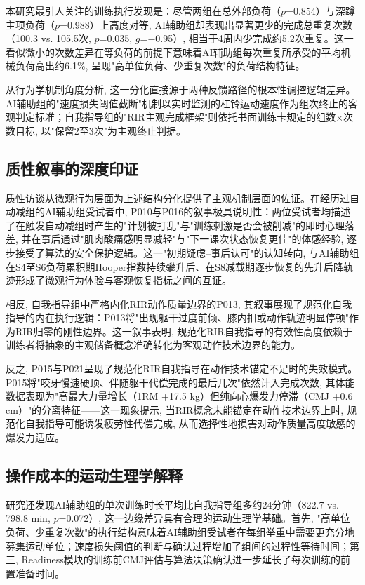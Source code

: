本研究最引人关注的训练执行发现是：尽管两组在总外部负荷（$p$=0.854）与深蹲主项负荷（$p$=0.988）上高度对等, AI辅助组却表现出显著更少的完成总重复次数（100.3 vs. 105.5次, $p$=0.035, $g$=$-$0.95）, 相当于4周内少完成约5.2次重复。这一看似微小的次数差异在等负荷的前提下意味着AI辅助组每次重复所承受的平均机械负荷高出约6.1\%, 呈现"高单位负荷、少重复次数"的负荷结构特征。

从行为学机制角度分析, 这一分化直接源于两种反馈路径的根本性调控逻辑差异。AI辅助组的"速度损失阈值截断"机制以实时监测的杠铃运动速度作为组次终止的客观判定标准；自我指导组的"RIR主观完成框架"则依托书面训练卡规定的组数$\times$次数目标, 以"保留2至3次"为主观终止判据。

\subsection{质性叙事的深度印证}
\label{sec:qualitative_印证}

质性访谈从微观行为层面为上述结构分化提供了主观机制层面的佐证。在经历过自动减组的AI辅助组受试者中, P010与P016的叙事极具说明性：两位受试者均描述了在触发自动减组时产生的"计划被打乱"与"训练刺激是否会被削减"的即时心理落差, 并在事后通过"肌肉酸痛感明显减轻"与"下一课次状态恢复更佳"的体感经验, 逐步接受了算法的安全保护逻辑。这一"初期疑虑--事后认可"的认知转向, 与AI辅助组在S4至S6负荷累积期Hooper指数持续攀升后、在S8减载期逐步恢复的先升后降轨迹形成了微观行为体验与客观恢复指标之间的互证。

相反, 自我指导组中严格内化RIR动作质量边界的P013, 其叙事展现了规范化自我指导的内在执行逻辑：P013将"出现躯干过度前倾、膝内扣或动作轨迹明显停顿"作为RIR归零的刚性边界。这一叙事表明, 规范化RIR自我指导的有效性高度依赖于训练者将抽象的主观储备概念准确转化为客观动作技术边界的能力。

反之, P015与P021呈现了规范化RIR自我指导在动作技术锚定不足时的失效模式。P015将"咬牙慢速硬顶、伴随躯干代偿完成的最后几次"依然计入完成次数, 其体能数据表现为"高最大力量增长（1RM +17.5 kg）但纯向心爆发力停滞（CMJ +0.6 cm）"的分离特征——这一现象提示, 当RIR概念未能锚定在动作技术边界上时, 规范化自我指导可能诱发疲劳性代偿完成, 从而选择性地损害对动作质量高度敏感的爆发力适应。

\subsection{操作成本的运动生理学解释}
\label{sec:operation_cost}

研究还发现AI辅助组的单次训练时长平均比自我指导组多约24分钟（822.7 vs. 798.8 min, $p$=0.072）, 这一边缘差异具有合理的运动生理学基础。首先, "高单位负荷、少重复次数"的执行结构意味着AI辅助组受试者在每组举重中需要更充分地募集运动单位；速度损失阈值的判断与确认过程增加了组间的过程性等待时间；第三, Readiness模块的训练前CMJ评估与算法决策确认进一步延长了每次训练的前置准备时间。

